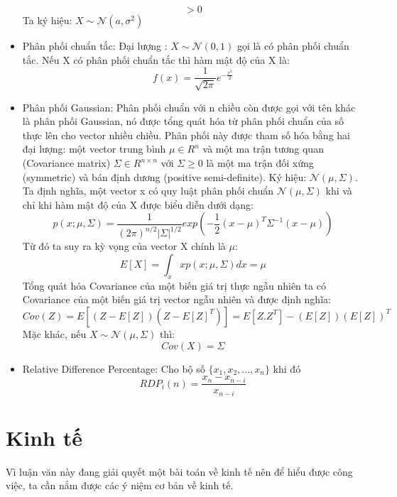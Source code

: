 \begin{itemize}
\[  > 0
  \]
  Ta ký hiệu: $X \sim \mathcal{N}(a,\sigma^2)$
  \item Phân phối chuẩn tắc: Đại lượng : $X \sim \mathcal{N}(0,1)$ gọi là
  có phân phối chuẩn tắc. Nếu X có phân phối chuẩn tắc thì hàm mật độ của X là:
  \[ f(x)=\frac{1}{\sqrt{2\pi}}e^{-\frac{x^2}{2}} \]
  \item Phân phối Gaussian: Phân phối chuẩn với n chiều còn được gọi với tên
  khác là phân phối Gaussian, nó được tổng quát hóa từ phân phối chuẩn của số
  thực lên cho vector nhiều chiều. Phân phối này được tham số hóa bằng hai đại
  lượng: một vector trung bình $\mu \in R^n$ và một ma trận tương quan
  (Covariance matrix) $\Sigma \in R^{n \times n}$ với $\Sigma \geq 0$ là một ma
  trận đối xứng (symmetric) và bán định dương (positive semi-definite). Ký hiệu:
  $\mathcal{N} (\mu, \Sigma)$.\\
  Ta định nghĩa, một vector x có quy luật phân phối chuẩn $\mathcal{N} (\mu,
  \Sigma)$ khi và chỉ khi hàm mật độ của X được biểu diễn dưới dạng:
  \[ p(x;\mu,\Sigma) = \frac{1}{(2\pi)^{n/2}|\Sigma|^{1/2}} exp\left(
  -\frac{1}{2}(x-\mu)^T\Sigma^{-1}(x-\mu) \right) \] Từ đó ta suy ra kỳ vọng của
  vector X chính là $\mu$:
  \[ E[X] = \int_x xp(x;\mu,\Sigma)dx = \mu \]
  Tổng quát hóa Covariance của một biến giá trị thực ngẫu nhiên ta có Covariance
  của một biến giá trị vector ngẫu nhiên và được định nghĩa:
  \[ Cov(Z) = E[(Z-E[Z])(Z-E[Z]^T)] = E[Z.Z^T] - (E[Z])(E[Z])^T \]
  Mặc khác, nếu $X \sim \mathcal{N}(\mu,\Sigma)$ thì: 
  \[ Cov(X) = \Sigma \]
  \item Relative Difference Percentage: Cho bộ số $\{ x_1, x_2,..., x_n \}$ khi đó
  \[
    RDP_i(n)=\frac{x_n-x_{n-i}}{x_{n-i}}
  \]
\end{itemize}

\section{Kinh tế}
Vì luận văn này đang giải quyết một bài toán về kinh tế nên để hiểu được công 
việc, ta cần nắm được các ý niệm cơ bản về kinh tế.
